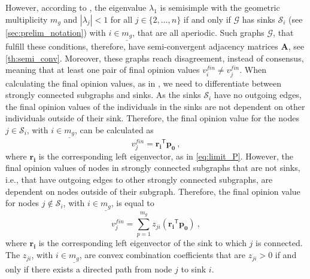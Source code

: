 \documentclass[journal,compsoc,10pt]{IEEEtran}
\newcommand{\gG}{\mathcal{G}}
\newcommand{\gS}{\mathcal{S}} %
\newcommand{\T}{\mathsf{T}}            %
\renewcommand{\vec}[1]{\bm{#1}}        %
\newcommand{\mat}[1]{\bm{#1}}          %
\begin{document}
However, according to \cite{Bullo_lecture}, the eigenvalue $\lambda_1$ is semisimple with the geometric multiplicity $m_g$ and $|\lambda_j| < 1$ for all $j \in \{2,\dots,n\}$ if and only if $\gG$ has sinks $\gS_i$ (see \cref{sec:prelim_notation}) with $i\in\underline{m_g}$, that are all aperiodic. Such graphs $\gG$, that fulfill these conditions, therefore, have semi-convergent adjacency matrices $\mat A$, see \cref{th:semi_conv}.
Moreover, these graphs reach disagreement, instead of consensus, meaning that at least one pair of final opinion values $v_{i}^{fin} \neq v_{j}^{fin}$.
When calculating the final opinion values, as in \cite{Bullo_lecture}, we need to differentiate between strongly connected subgraphs and sinks. As the sinks $\gS_i$ have no outgoing edges, the final opinion values of the individuals in the sinks are not dependent on other individuals outside of their sink. Therefore, the final opinion value for the nodes $j\in \gS_i$, with $i\in \underline{m_g}$, can be calculated as
\[v_j^{fin} = \vec{r_i}^\T \vec{p_0}\ ,\]
where $\vec{r_i}$ is the corresponding left eigenvector, as in \cref{eq:limit_P}. However, the final opinion values of nodes in strongly connected subgraphs that are not sinks, i.e., that have outgoing edges to other strongly connected subgraphs, are dependent on nodes outside of their subgraph. Therefore, the final opinion value for nodes $j\notin \gS_i$, with $i\in \underline{m_g}$, is equal to
\[v_j^{fin} = \sum_{p=1}^{m_g}z_{ji}(\vec{r_i}^\T \vec{p_0})\ ,\]
where $\vec{r_i}$ is the corresponding left eigenvector of the sink to which $j$ is connected. The $z_{ji}$, with $i\in \underline{m_g}$, are convex combination coefficients that are $z_{ji} > 0$ if and only if there exists a directed path from node $j$ to sink $i$.
\end{document}
